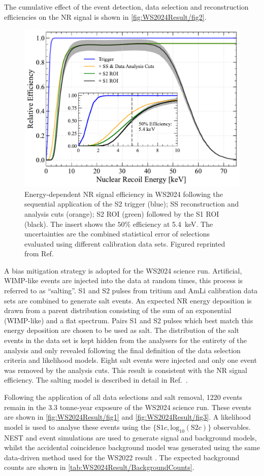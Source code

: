 The cumulative effect of the event detection, data selection and reconstruction efficiencies on the NR signal is shown in \autoref{fig:WS2024Result/fig2}.
\begin{figure}[t!]
    \centering
    \includegraphics[width=0.7\linewidth]{figures/WS2024Result/figure2.pdf}
    \caption[Energy-dependent NR signal efficiency in the WS2024 analysis.]{Energy-dependent NR signal efficiency in WS2024 following the sequential application of the S2 trigger (blue); SS reconstruction and analysis cuts (orange); S2 ROI (green) followed by the S1 ROI (black). The insert shows the $50\%$ efficiency at 5.4~keV. The uncertainties are the combined statistical error of selections evaluated using different calibration data sets. Figured reprinted from Ref.~\cite{LZCollaboration:2024lux}}
    \label{fig:WS2024Result/fig2}
\end{figure}
A bias mitigation strategy is adopted for the WS2024 science run. Artificial, WIMP-like events are injected into the data at random times, this process is referred to as ``salting''. S1 and S2 pulses from tritium and AmLi calibration data sets are combined to generate salt events. An expected NR energy deposition is drawn from a parent distribution consisting of the sum of an exponential (WIMP-like) and a flat spectrum. Pairs S1 and S2 pulses which best match this energy deposition are chosen to be used as salt. The distribution of the salt events in the data set is kept hidden from the analysers for the entirety of the analysis and only revealed following the final definition of the data selection criteria and likelihood models. Eight salt events were injected and only one event was removed by the analysis cuts. This result is consistent with the NR signal efficiency. The salting model is described in detail in Ref.~\cite{LZCollaboration:2024lux}.

Following the application of all data selections and salt removal, 1220 events remain in the 3.3 tonne-year exposure of the WS2024 science run. These events are shown in \autoref{fig:WS2024Result/fig1} and \autoref{fig:WS2024Result/fig3}. A likelihood model is used to analyse these events using the $\{\text{S1}c,\text{log}_{10}(\text{S2}c)\}$ observables. NEST and event simulations \cite{LZ_SIMS} are used to generate signal and background models, whilst the accidental coincidence background model was generated using the same data-driven method used for the WS2022 result \cite{LZ:2022lsv}. The expected background counts are shown in \autoref{tab:WS2024Result/BackgroundCounts}.

